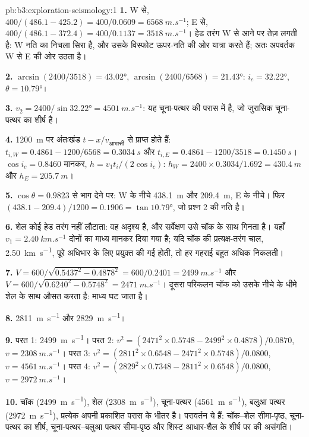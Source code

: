 \begin{solution}{pb:b3:exploration-seismology:1}
\textbf{1.} W से, $400/(486.1 - 425.2) = 400/0.0609 = \qty{6568}{m.s^{-1}}$;
E से, $400/(486.1 - 372.4) = 400/0.1137 = \qty{3518}{m.s^{-1}}$। हेड
तरंग W से आने पर तेज़ लगती है: W नति का निचला सिरा है, और उसके विस्फोट ऊपर-नति की ओर यात्रा करते हैं; अतः
अपवर्तक W से E की ओर उठता है।

\textbf{2.} $\arcsin(2400/3518) = \ang{43.02}$, $\arcsin(2400/6568) =
\ang{21.43}$: $i_c = \ang{32.22}$, $\theta = \ang{10.79}$।

\textbf{3.} $v_2 = 2400/\sin\ang{32.22} = \qty{4501}{m.s^{-1}}$: यह चूना-पत्थर की परास में है,
जो जुरासिक चूना-पत्थर का शीर्ष है।

\textbf{4.} \qty{1200}{m} पर अंतःखंड $t - x/v_{\text{आभासी}}$ से प्राप्त होते हैं:
$t_{i,W} = 0.4861 - 1200/6568 = \qty{0.3034}{s}$ और $t_{i,E} = 0.4861 -
1200/3518 = \qty{0.1450}{s}$। $\cos i_c = 0.8460$ मानकर, $h = v_1t_i/(2\cos
i_c)$: $h_W = 2400\times0.3034/1.692 = \qty{430.4}{m}$ और $h_E =
\qty{205.7}{m}$।

\textbf{5.} $\cos\theta = 0.9823$ से भाग देने पर: W के नीचे \qty{438.1}{m} और
\qty{209.4}{m}, E के नीचे। फिर $(438.1 - 209.4)/1200 = 0.1906 =
\tan\ang{10.79}$, जो प्रश्न 2 की नति है।

\textbf{6.} शेल कोई हेड तरंग नहीं लौटाता: वह अदृश्य है, और सर्वेक्षण
उसे चॉक के साथ गिनता है। यहाँ $v_1 = \qty{2.40}{km.s^{-1}}$ दोनों का
माध्य मानकर दिया गया है; यदि चॉक की प्रत्यक्ष-तरंग चाल, \qty{2.50}{km.s^{-1}},
पूरे अधिभार के लिए प्रयुक्त की गई होती, तो हर गहराई बहुत अधिक निकलती।

\textbf{7.} $V = 600/\sqrt{0.5437^2 - 0.4878^2} = 600/0.2401 =
\qty{2499}{m.s^{-1}}$ और $V = 600/\sqrt{0.6240^2 - 0.5748^2} =
\qty{2471}{m.s^{-1}}$। दूसरा परिकलन चॉक को उसके नीचे के धीमे शेल के साथ
औसत करता है: माध्य घट जाता है।

\textbf{8.} \qty{2811}{m.s^{-1}} और \qty{2829}{m.s^{-1}}।

\textbf{9.} परत 1: \qty{2499}{m.s^{-1}}। परत 2: $v^2 = (2471^2\times0.5748
- 2499^2\times0.4878)/0.0870$, $v = \qty{2308}{m.s^{-1}}$। परत 3:
$v^2 = (2811^2\times0.6548 - 2471^2\times0.5748)/0.0800$,
$v = \qty{4561}{m.s^{-1}}$। परत 4: $v^2 = (2829^2\times0.7348 -
2811^2\times0.6548)/0.0800$, $v = \qty{2972}{m.s^{-1}}$।

\textbf{10.} चॉक (\qty{2499}{m.s^{-1}}), शेल (\qty{2308}{m.s^{-1}}),
चूना-पत्थर (\qty{4561}{m.s^{-1}}), बलुआ पत्थर (\qty{2972}{m.s^{-1}}), प्रत्येक अपनी
प्रकाशित परास के भीतर है। परावर्तन ये हैं: चॉक--शेल सीमा-पृष्ठ, चूना-पत्थर का शीर्ष,
चूना-पत्थर--बलुआ पत्थर सीमा-पृष्ठ और
शिस्ट आधार-शैल के शीर्ष पर की असंगति।


\end{solution}
